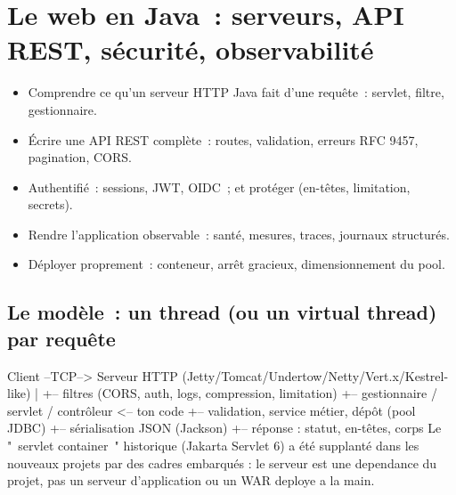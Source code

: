 \documentclass[12pt,a4paper,twoside,openright]{book}
\begin{document}
\chapter{Le web en Java~: serveurs, API REST, s\'ecurit\'e, observabilit\'e}
\label{ch-java-web}

\begin{objectif}
\begin{itemize}
  \item Comprendre ce qu'un serveur HTTP Java fait d'une requ\^ete~: servlet, filtre, gestionnaire.
  \item \'Ecrire une API REST compl\`ete~: routes, validation, erreurs RFC 9457, pagination, CORS.
  \item Authentifi\'e~: sessions, JWT, OIDC~; et prot\'eger (en-t\^etes, limitation, secrets).
  \item Rendre l'application observable~: sant\'e, mesures, traces, journaux structur\'es.
  \item D\'eployer proprement~: conteneur, arr\^et gracieux, dimensionnement du pool.
\end{itemize}
\end{objectif}

\section{Le mod\`ele~: un thread (ou un virtual thread) par requ\^ete}

\begin{codeplain}
Client --TCP--> Serveur HTTP (Jetty/Tomcat/Undertow/Netty/Vert.x/Kestrel-like)
                    |
                    +-- filtres (CORS, auth, logs, compression, limitation)
                    +-- gestionnaire / servlet / contr\^oleur   <-- ton code
                            +-- validation, service m\'etier, d\'ep\^ot (pool JDBC)
                            +-- s\'erialisation JSON (Jackson)
                    +-- r\'eponse : statut, en-t\^etes, corps
Le "~servlet container~" historique (Jakarta Servlet 6) a \'et\'e supplant\'e dans les nouveaux
projets par des cadres embarqu\'es : le serveur est une dependance du projet, pas un
serveur d'application ou un WAR deploye a la main.
\end{codeplain}
\end{document}
